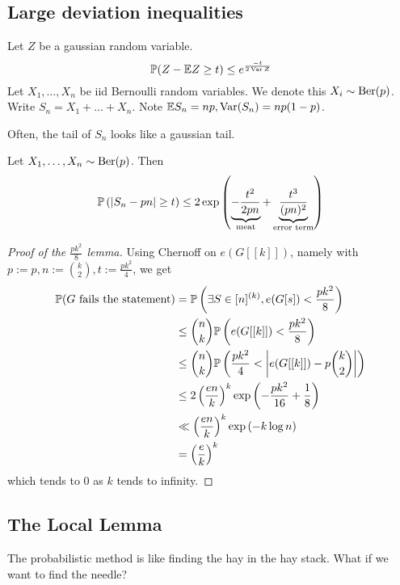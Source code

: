 \documentclass{article}
\begin{document}
\subsection{Large deviation inequalities}

Let $Z$ be a gaussian random variable.
$$\mathbb P(Z - \mathbb E Z \ge t) \le e^{\frac{-t}{2\operatorname{Var} Z}}$$
Let $X_1, \dots, X_n$ be iid Bernoulli random variables. We denote this $X_i \sim \operatorname{Ber}(p)$. Write $S_n = X_1 + \dots + X_n$. Note $\mathbb E S_n = np, \operatorname{Var}(S_n) = np(1 - p)$.

\begin{idea}
  Often, the tail of $S_n$ looks like a gaussian tail.
\end{idea}

\begin{thm}
  Let $X_1, \dots, X_n \sim \operatorname{Ber}(p)$. Then
  $$\mathbb P\left(\left\lvert S_n - pn\right\rvert \ge t\right) \le 2\exp\left(\underbrace{-\frac{t^2}{2pn}}_{\text{meat}} + \underbrace{\frac{t^3}{(pn)^2}}_{\text{error term}}\right)$$
\end{thm}

\newlec

\begin{proof}[Proof of the $\frac{pk^2}8$ lemma]
  Using Chernoff on $e(G[[k]])$, namely with $p := p, n := \binom k2, t := \frac{pk^2}4$, we get
  \begin{align*}
    \mathbb P(G \text{ fails the statement})
    & = \mathbb P\left(\exists S \in [n]^{(k)}, e(G[s]) < \frac{pk^2}8\right) \\
    & \le \binom nk \mathbb P\left(e(G[[k]]) < \frac{pk^2}8\right) \\
    & \le \binom nk \mathbb P\left(\frac{pk^2}4 < \left\lvert e(G[[k]]) - p\binom k2\right\rvert\right) \\
    & \le 2\left(\frac{en}k\right)^k \exp\left(-\frac{pk^2}{16} + \frac 18\right) \\
    & \ll \left(\frac{en}k\right)^k \exp\left(-k\log n\right) \\
    & = \left(\frac ek\right)^k
  \end{align*}
  which tends to 0 as $k$ tends to infinity.
\end{proof}

\subsection{The Local Lemma}

The probabilistic method is like finding the hay in the hay stack. What if we want to find the needle?
\end{document}
